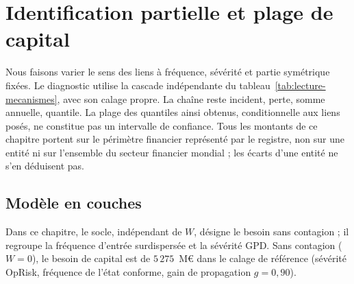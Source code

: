 ﻿%
\chapter{Identification partielle et plage de capital}
\label{chap:partielle}

Nous faisons varier le sens des liens à fréquence, sévérité et partie symétrique fixées.
Le diagnostic utilise la cascade indépendante du tableau~\ref{tab:lecture-mecanismes}, avec son
calage propre. La chaîne reste incident, perte, somme annuelle, quantile. La plage des quantiles
ainsi obtenus, conditionnelle aux liens posés, ne constitue pas un intervalle de confiance.
Tous les montants de ce chapitre portent sur le périmètre financier représenté par le registre,
non sur une entité ni sur l'ensemble du secteur financier mondial ; les écarts d'une entité ne s'en déduisent pas.

\section{Modèle en couches}

Dans ce chapitre, le socle, indépendant de $W$, désigne le besoin sans contagion ; il regroupe la fréquence d'entrée surdispersée
et la sévérité GPD. Sans contagion ($W = 0$), le besoin de capital est de $5\,275$~M\euro{} dans le calage
de référence (sévérité OpRisk, fréquence de l'état conforme, gain de propagation $g=0{,}90$).

